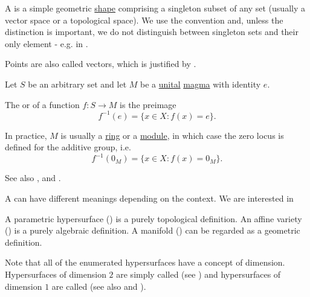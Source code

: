 \begin{definition}\label{def:point}
  A  is a simple geometric \hyperref[def:geometric_shape]{shape} comprising a singleton subset of any set (usually a vector space or a topological space). We use the convention  and, unless the distinction is important, we do not distinguish between singleton sets and their only element - e.g. in .

  Points are also called vectors, which is justified by .
\end{definition}

\begin{definition}\label{def:zero_locus}
  Let \( S \) be an arbitrary set and let \( M \) be a \hyperref[def:algebraic_theory/identity]{unital} \hyperref[def:magma/magma]{magma} with identity \( e \).

  The  or  of a function \( f: S \to M \) is the preimage
  \begin{equation*}
    f^{-1}(e) = \{ x \in X \colon f(x) = e \}.
  \end{equation*}

  In practice, \( M \) is usually a \hyperref[def:semiring/ring]{ring} or a \hyperref[def:left_module]{module}, in which case the zero locus is defined for the additive group, i.e.
  \begin{equation*}
    f^{-1}(0_M) = \{ x \in X \colon f(x) = 0_M \}.
  \end{equation*}

  See also ,  and .
\end{definition}

\begin{definition}\label{def:hypersurface}
  A  can have different meanings depending on the context. We are interested in

  \begin{defenum}
     A parametric hypersurface () is a purely topological definition.
     An affine variety () is a purely algebraic definition.
     A manifold () can be regarded as a geometric definition.
  \end{defenum}

  Note that all of the enumerated hypersurfaces have a concept of dimension. Hypersurfaces of dimension \( 2 \) are simply called  (see ) and hypersurfaces of dimension \( 1 \) are called  (see also  and ).
\end{definition}


